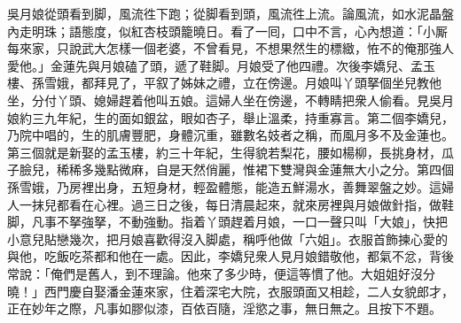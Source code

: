 吳月娘從頭看到脚，風流徃下跑；從脚看到頭，風流徃上流。{}論風流，如水泥晶盤內走明珠；{}語態度，似紅杏枝頭籠曉日。看了一囘，口中不言，心內想道：「小厮每來家，只說武大怎樣一個老婆，不曾看見，不想果然生的標緻，恠不的俺那強人愛他。」{}金蓮先與月娘磕了頭，遞了鞋脚。月娘受了他四禮。次後李嬌兒、孟玉樓、孫雪娥，都拜見了，平叙了姊妹之禮，立在傍邊。月娘叫丫頭拏個坐兒教他坐，分付丫頭、媳婦趕着他叫五娘。這婦人坐在傍邊，不轉睛把衆人偷看。見吳月娘約三九年紀，生的面如銀盆，眼如杏子，舉止溫柔，持重寡言。第二個李嬌兒，乃院中唱的，生的肌膚豐肥，身體沉重，雖數名妓者之稱，而風月多不及金蓮也。第三個就是新娶的孟玉樓，約三十年紀，生得貌若梨花，腰如楊柳，長挑身材，瓜子臉兒，稀稀多幾點微麻，自是天然俏麗，惟裙下雙灣與金蓮無大小之分。第四個孫雪娥，乃房裡出身，五短身材，輕盈體態，能造五鮮湯水，善舞翠盤之妙。這婦人一抹兒都看在心裡。過三日之後，每日清晨起來，就來房裡與月娘做針指，做鞋脚，凡事不拏強拏，不動強動。{}指着丫頭趕着月娘，一口一聲只叫「大娘」，快把小意兒貼戀幾次，把月娘喜歡得沒入脚處，稱呼他做「六姐」。衣服首飾揀心愛的與他，吃飯吃茶都和他在一處。{}因此，李嬌兒衆人見月娘錯敬他，都氣不忿，背後常說：「俺們是舊人，到不理論。他來了多少時，便這等慣了他。大姐姐好沒分曉！」西門慶自娶潘金蓮來家，住着深宅大院，衣服頭面又相趁，二人女貌郎才，正在妙年之際，凡事如膠似漆，百依百隨，淫慾之事，無日無之。且按下不題。

